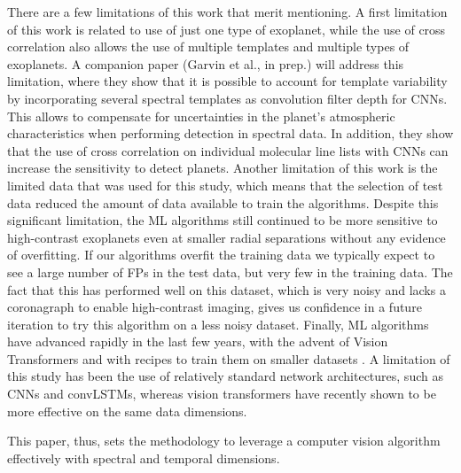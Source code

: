 \documentclass{aa}
\begin{document}
There are a few limitations of this work that merit mentioning.
A first limitation of this work is related to use of just one type of exoplanet, while the use of cross correlation also allows the use of multiple templates and multiple types of exoplanets.
A companion paper (Garvin et al., in prep.) %
will address this limitation, where they show that it is possible to account for template variability by incorporating several spectral templates as convolution filter depth for CNNs. 
This allows to compensate for uncertainties in the planet's atmospheric characteristics when performing detection in spectral data.
In addition, they show that the use of cross correlation on individual molecular line lists with CNNs can increase the sensitivity to detect planets.
Another limitation of this work is the limited data that was used for this study, which means that the selection of test data reduced the amount of data available to train the algorithms.
Despite this significant limitation, the ML algorithms still continued to be more sensitive to high-contrast exoplanets even at smaller radial separations without any evidence of overfitting.
If our algorithms overfit the training data we typically expect to see a large number of FPs in the test data, but very few in the training data. 
The fact that this has performed well on this dataset, which is very noisy and lacks a coronagraph to enable high-contrast imaging, gives us confidence in a future iteration to try this algorithm on a less noisy dataset.
Finally, ML algorithms have advanced rapidly in the last few years, with the advent of Vision Transformers \citep{2020ViT} and with recipes to train them on smaller datasets \citep[e.g.,][]{2022Gani}.
A limitation of this study has been the use of relatively standard network architectures, such as CNNs and convLSTMs, whereas vision transformers have recently shown to be more effective on the same data dimensions.

This paper, thus, sets the methodology to leverage a computer vision algorithm effectively with spectral and temporal dimensions.
\end{document}
